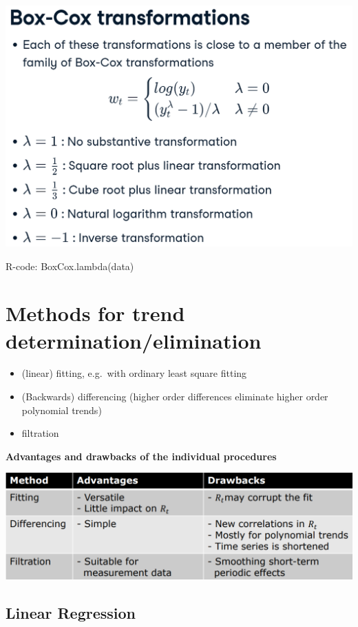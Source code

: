 \documentclass[
]{article}
\begin{document}
\includegraphics[width=1\linewidth]{box}

R-code: BoxCox.lambda(data)

\hypertarget{methods-for-trend-determinationelimination}{%
\section{Methods for trend
determination/elimination}\label{methods-for-trend-determinationelimination}}

\begin{itemize}
\item
  (linear) fitting, e.g.~with ordinary least square fitting
\item
  (Backwards) differencing (higher order differences eliminate higher
  order polynomial trends)
\item
  filtration
\end{itemize}

\textbf{Advantages and drawbacks of the individual procedures}

\includegraphics[width=1\linewidth]{adv}

\hypertarget{linear-regression}{%
\subsection{Linear Regression}\label{linear-regression}}
\end{document}
